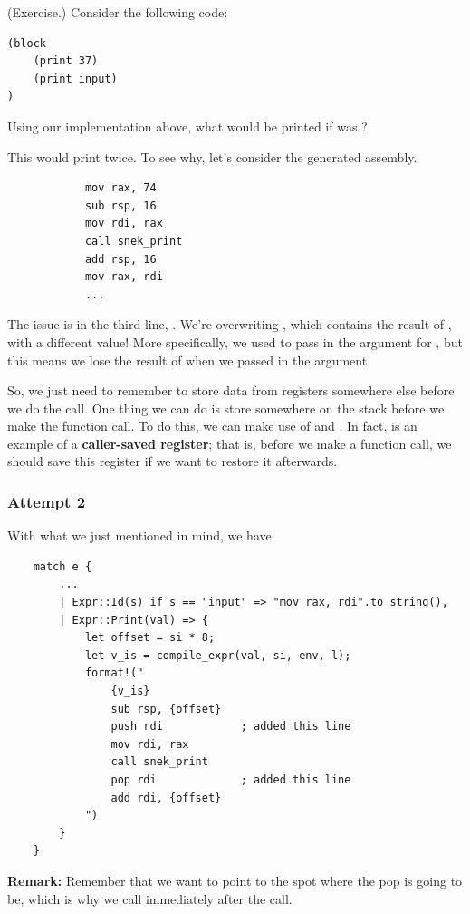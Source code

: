 \documentclass[letterpaper]{article}
\begin{document}
\begin{mdframed}
    (Exercise.) Consider the following code: 
    \begin{verbatim}
(block 
    (print 37)
    (print input)
)\end{verbatim}
    Using our implementation above, what would be printed if  was ? 

    \begin{mdframed}
        This would print  twice. To see why, let's consider the generated assembly.
        \begin{verbatim}
            mov rax, 74
            sub rsp, 16 
            mov rdi, rax 
            call snek_print 
            add rsp, 16 
            mov rax, rdi 
            ... \end{verbatim}
        The issue is in the third line, . We're overwriting , which contains the result of , with a different value! More specifically, we used  to pass in the argument for , but this means we lose the result of  when we passed in the argument.
    \end{mdframed}
\end{mdframed}
So, we just need to remember to store data from registers somewhere else before we do the call. One thing we can do is store  somewhere on the stack before we make the function call. To do this, we can make use of  and . In fact,  is an example of a \textbf{caller-saved register}; that is, before we make a function call, we should save this register if we want to restore it afterwards. 


\subsubsection{Attempt 2}
With what we just mentioned in mind, we have 
\begin{verbatim}
    match e {
        ... 
        | Expr::Id(s) if s == "input" => "mov rax, rdi".to_string(),
        | Expr::Print(val) => {
            let offset = si * 8; 
            let v_is = compile_expr(val, si, env, l);
            format!("
                {v_is}
                sub rsp, {offset}
                push rdi            ; added this line 
                mov rdi, rax 
                call snek_print
                pop rdi             ; added this line 
                add rdi, {offset}
            ")
        }
    }\end{verbatim}
\textbf{Remark:} Remember that we want  to point to the spot where the pop is going to be, which is why we call  immediately after the  call. 
\end{document}
